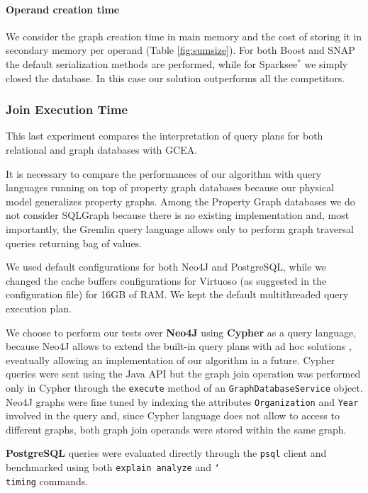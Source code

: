 \paragraph*{Operand creation time}
We consider the graph creation time in main memory
and the cost of storing it in secondary memory
per operand (Table \ref{fig:sumsize}). For both Boost and SNAP the default
serialization methods are performed, while for
Sparksee$^*$ we simply closed the database. In this case our solution outperforms all the competitors.


\subsubsection{Join Execution Time}\label{sec:qplan}
This last experiment compares the interpretation of query plans for both relational
and graph databases with  GCEA. %

It is necessary to compare the performances of our algorithm with query languages running on top of property graph
databases because our physical model generalizes property graphs. Among the Property Graph
databases  we do
not consider SQLGraph  \cite{SQLGraph} because there
is no existing implementation and, most importantly, the Gremlin query language allows
only to perform graph traversal queries returning bag of values.

We used default configurations for both Neo4J and PostgreSQL, while we changed the
cache buffers configurations for Virtuoso (as suggested in the configuration file) for
16GB of RAM. We kept the default multithreaded query execution plan.

We choose to
perform our tests over \textbf{Neo4J} using \textbf{Cypher} as a query language, because Neo4J allows to extend the built-in
query plans with ad hoc solutions \cite{Neo4jAlg}, eventually allowing an implementation of
our algorithm in a future.
Cypher queries
were sent using the Java API but the graph join operation was performed only in
Cypher through the \texttt{execute} method of an \texttt{Graph\-Database\-Service}
object.
Neo4J graphs were fine tuned by indexing the attributes \texttt{Organization}
and \texttt{Year} involved in the query and, since Cypher language does not allow to
access to different graphs, both graph join operands were stored within the same graph.

\textbf{PostgreSQL} queries were evaluated directly through
the \texttt{psql} client and benchmarked using both \texttt{explain analyze} and
\texttt{\char`\\timing} commands.

